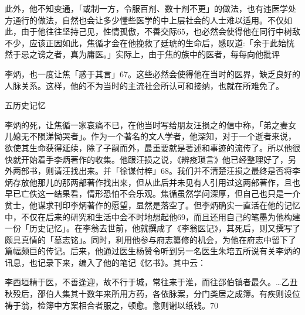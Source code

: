 此外，他不知变通，「或制一方，令服百剂、数十剂不更」的做法，也有违医学处方通行的做法，自然也会让多少懂些医学的中上层社会的人士难以适用。不仅如此，由于他往往坚持己见，性情孤傲，不善交际65，也必然会使得他在同行中树敌不少，应该正因如此，焦循才会在他挽救了廷琥的生命后，感叹道:「余于此始恍然于忌之谤之者，真为庸医。」实际上，由于焦的族中的医者，每每向他批评

\vfill
\begin{BookNotes}
\end{BookNotes}

\noindent 李炳，也一度让焦「惑于其言」67。这些必然会使得他在当时的医界，缺乏良好的人脉关系。这样，他的不为当时的主流社会所认可和接纳，也就在所难免了。

五历史记忆

李炳的死，让焦循一家哀痛不已，在他当时写给朋友汪损之的信中称，「弟之妻女儿媳无不陨涕恸哭者」。作为一个著名的文人学者，他深知，对于一个逝者来说，欲使其生命获得延续，除了子嗣而外，最重要就是著述和事迹的流传了。所以他很快就开始着手李炳著作的收集。他跟汪损之说，《辨疫琐言》他已经整理好了，另外两部书，则请汪找出来。并「徐谋付梓」68。我们并不清楚汪损之最终是否将李炳存放他那儿的那两部著作找出来，但从此后并未见有人引用过这两部著作，且也早已亡佚这一结果看，情形恐怕不会乐观。焦循虽然学问深厚，但自己也只是一介贫士，他谋求刊印李炳著作的愿望，显然是落空了。但李炳确实一直活在他的记忆中，不仅在后来的研究和生活中会不时地想起他69，而且还用自己的笔墨为他构建一份「历史记忆」。在李翁去世前，他就撰成了《李翁医记》，其死后，则又撰写了颇具真情的「墓志铭」。同时，利用他参与府志纂修的机会，为他在府志中留下了篇幅颇巨的传记。后来，他通过医生杨赞令听到另一名医生朱培五所说有关李炳的讯息，也记录下来，编入了他的笔记《忆书》。其中云：

\begin{BookQuote}
李西垣精于医，不善逢迎，故不行于城，常往来于淮，而往邵伯镇者最久。…乙丑秋殁后，邵伯人集其十数年来所用方药，各依脉案，分门类居之成簿。有疾则设位祷于翁，检簿中方案相合者服之，顿愈。愈则谢以纸钱。70
\end{BookQuote}

